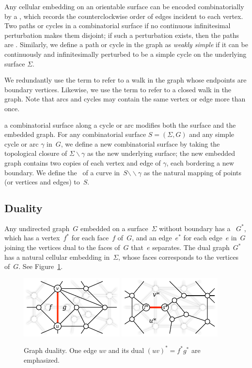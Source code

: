 \documentclass[11pt,twoside]{article}
\def\snip{\mathbin{\raisebox{0.15ex}{\rotatebox[origin=c]{60}{\Rightscissors}\!}}}
\def\snip{\mathbin{\backslash\!\!\backslash}}
\begin{document}
Any cellular embedding on an orientable surface can be encoded combinatorially
by a , which records the counterclockwise order of edges
incident to each vertex.
Two paths or cycles in a combinatorial surface  if no continuous infinitesimal perturbation makes them disjoint; if such a perturbation exists, then the paths are .
Similarly, we define a path or cycle in the graph as \emph{weakly simple} if it can be continuously and infinitesimally perturbed to be a simple cycle on the underlying surface $\Sigma$.


We redundantly use the term  to refer to a walk in the graph whose endpoints are boundary vertices.  Likewise, we use the term  to refer to a closed walk in the graph.  Note that arcs and cycles may contain the same vertex or edge more than once.


 a combinatorial surface along a cycle or  arc modifies both the surface and the embedded graph.
For any combinatorial surface $S = (\Sigma, G)$ and any simple cycle or arc $\gamma$ in~$G$, we define a new combinatorial surface \EMPH{$S \snip \gamma$} by taking the topological closure of $\Sigma \backslash \gamma$ as the new underlying surface; the new embedded graph contains two copies of each vertex and edge of $\gamma$, each bordering a new boundary.
We define the~ of a curve in~$S \snip \gamma$ as the natural mapping of points (or vertices and edges) to~$S$. 


\subsection{Duality}


Any undirected graph~$G$ embedded on a surface~$\Sigma$ without boundary has a
~$G^*$, which has a vertex~$f^*$ for each face~$f$ of~$G$,
and an edge~$e^*$ for each edge~$e$ in~$G$ joining the vertices dual to the
faces of~$G$ that~$e$ separates. The dual graph~$G^*$ has a natural cellular
embedding in~$\Sigma$, whose faces corresponds to the vertices of~$G$.
See Figure~\ref{fig:prelims_primaldual}.


\begin{figure}[ht]
\centering
\includegraphics[height=1.25in]{Fig/primal}\quad
\includegraphics[height=1.25in]{Fig/dual}
\caption{Graph duality.  One edge $uv$ and its dual $(uv)^* =
f^*g^*$ are emphasized.} \label{fig:prelims_primaldual}
\end{figure}
\end{document}
